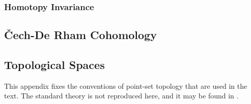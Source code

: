 \documentclass[a4paper,12pt]{article}
\begin{document}
\subsubsection{Homotopy Invariance}\label{subsubsec:de_rham_theory:de_rham_cohomology:homotopy_invariance}

\subsection{\v{C}ech-De Rham Cohomology}

\printbibliography

\begin{appendices}

\section{Topological Spaces}\label{sec:topological_spaces}

This appendix fixes the conventions of point-set topology that are used in the text.
The standard theory is not reproduced here, and it may be found in \cite{Lee2011}.


\end{appendices}
\end{document}
